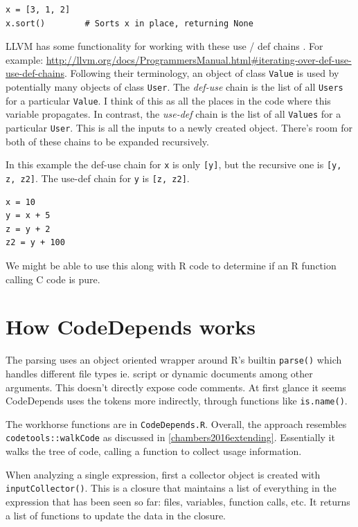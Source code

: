 \documentclass[12pt]{article}
\begin{document}
\begin{verbatim}
x = [3, 1, 2]
x.sort()        # Sorts x in place, returning None
\end{verbatim}

LLVM has some functionality for working with these use / def chains
\cite{Lattner2004}. For example:
\url{http://llvm.org/docs/ProgrammersManual.html#iterating-over-def-use-use-def-chains}.
Following their terminology, an object of class \texttt{Value} is used by
potentially many objects of class \texttt{User}. The \emph{def-use} chain
is the list of all \texttt{Users} for a particular \texttt{Value}. I think
of this as all the places in the code where this variable propagates. In
contrast, the \emph{use-def} chain is the list of all \texttt{Values} for a
particular \texttt{User}. This is all the inputs to a newly
created object. There's room for both of these chains to be expanded recursively.

In this example the def-use chain for \texttt{x} is only \texttt{[y]}, but the
recursive one is \texttt{[y, z, z2]}. The use-def chain for \texttt{y} is
\texttt{[z, z2]}.

\begin{verbatim}
x = 10
y = x + 5
z = y + 2
z2 = y + 100
\end{verbatim}

We might be able to use this along with R code to determine if an R
function calling C code is pure.

\section{How CodeDepends works}

The parsing uses an object oriented wrapper around R's builtin \texttt{parse()}
which handles different file types ie. script or dynamic documents among other arguments.
This doesn't directly expose code comments.
At first glance it seems CodeDepends uses the tokens
more indirectly, through functions like \texttt{is.name()}. 

The workhorse functions are in \texttt{CodeDepends.R}. Overall, the
approach resembles \texttt{codetools::walkCode} as discussed in
\ref{chambers2016extending}. Essentially it walks the tree of code, calling
a function to collect usage information.

When analyzing a single expression, first a 
collector object is created with \texttt{inputCollector()}. This is a
closure that maintains a list of everything in the expression that has been seen
so far: files, variables, function calls, etc. It returns a list of
functions to update the data in the closure.
\end{document}

